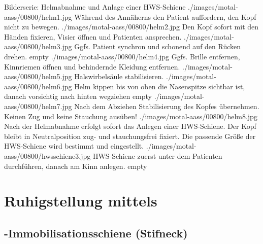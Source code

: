 \begin{PictureSeriesWide}{}{Bilderserie: Helmabnahme und Anlage
einer HWS-Schiene \label{fig:helmabnahme-hws-schiene}\label{fig:hws-schiene-anlegen}}
{./images/motal-aass/00800/helm1.jpg}%
{Während des Annäherns den Patient auffordern, den Kopf nicht zu bewegen.}
{./images/motal-aass/00800/helm2.jpg}%
{Den Kopf sofort mit den Händen fixieren, Visier öffnen und Patienten ansprechen.}
{./images/motal-aass/00800/helm3.jpg}%
{Ggfs. Patient synchron und schonend auf den Rücken drehen.}
{empty}%
{}
%
{./images/motal-aass/00800/helm4.jpg}%
{Ggfs. Brille entfernen, Kinnriemen öffnen und behindernde
Kleidung entfernen.}
{./images/motal-aass/00800/helm5.jpg}%
{Halswirbelsäule stabilisieren.}
{./images/motal-aass/00800/helm6.jpg}%
{Helm kippen bis von oben die Nasenspitze sichtbar ist,
danach vorsichtig nach hinten wegziehen}
{empty}%
{}
%
{./images/motal-aass/00800/helm7.jpg}%
{Nach dem Abziehen Stabilisierung des Kopfes übernehmen. Keinen Zug und keine Stauchung ausüben!}
{./images/motal-aass/00800/helm8.jpg}%
{Nach der Helmabnahme erfolgt sofort das Anlegen einer
HWS-Schiene. Der Kopf bleibt in Neutralposition zug- und
stauchungsfrei fixiert. Die passende Größe der HWS-Schiene
wird bestimmt und eingestellt.}
{./images/motal-aass/00800/hwsschiene3.jpg}%
{HWS-Schiene zuerst unter dem Patienten durchführen, danach
am Kinn anlegen.}
{empty}%
{}
\end{PictureSeriesWide}




\needspace{0.5\textheight}
\section{Ruhigstellung mittels }
\label{topic:schienung}\label{topic:schienungsmaterial}

\subsection{-Immobilisationsschiene (Stifneck\texttrademark)}
\label{topic:hws-schiene-anlegen}
\label{topic:hws-schiene-beschreibung}


